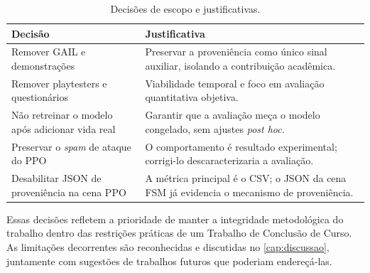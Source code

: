 \begin{table}[htb]
    \centering
    \caption{Decisões de escopo e justificativas.}
    \label{tab:decisoes-escopo}
    \begin{tabular}{p{5.5cm} p{8cm}}
        \toprule
        \textbf{Decisão} & \textbf{Justificativa} \\
        \midrule
        Remover GAIL e demonstrações &
            Preservar a proveniência como único sinal auxiliar, isolando
            a contribuição acadêmica. \\
        \addlinespace
        Remover playtesters e questionários &
            Viabilidade temporal e foco em avaliação quantitativa objetiva. \\
        \addlinespace
        Não retreinar o modelo após adicionar vida real &
            Garantir que a avaliação meça o modelo congelado, sem
            ajustes \textit{post hoc}. \\
        \addlinespace
        Preservar o \textit{spam} de ataque do PPO &
            O comportamento é resultado experimental; corrigi-lo
            descaracterizaria a avaliação. \\
        \addlinespace
        Desabilitar JSON de proveniência na cena PPO &
            A métrica principal é o CSV; o JSON da cena FSM já
            evidencia o mecanismo de proveniência. \\
        \bottomrule
    \end{tabular}
\end{table}

Essas decisões refletem a prioridade de manter a integridade metodológica do
trabalho dentro das restrições práticas de um Trabalho de Conclusão de Curso.
As limitações decorrentes são reconhecidas e discutidas no
\autoref{cap:discussao}, juntamente com sugestões de trabalhos futuros que
poderiam endereçá-las.
